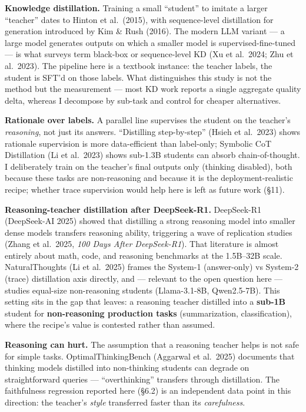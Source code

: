 \documentclass[11pt]{article}
\begin{document}
\textbf{Knowledge distillation.} Training a small ``student'' to imitate
a larger ``teacher'' dates to Hinton et al.~(2015), with sequence-level
distillation for generation introduced by Kim \& Rush (2016). The modern
LLM variant --- a large model generates outputs on which a smaller model
is supervised-fine-tuned --- is what surveys term black-box or
sequence-level KD (Xu et al.~2024; Zhu et al.~2023). The pipeline here
is a textbook instance: the teacher labels, the student is SFT'd on
those labels. What distinguishes this study is not the method but the
measurement --- most KD work reports a single aggregate quality delta,
whereas I decompose by sub-task and control for cheaper alternatives.

\textbf{Rationale over labels.} A parallel line supervises the student
on the teacher's \emph{reasoning}, not just its answers. ``Distilling
step-by-step'' (Hsieh et al.~2023) shows rationale supervision is more
data-efficient than label-only; Symbolic CoT Distillation (Li et
al.~2023) shows sub-1.3B students can absorb chain-of-thought. I
deliberately train on the teacher's final outputs only (thinking
disabled), both because these tasks are non-reasoning and because it is
the deployment-realistic recipe; whether trace supervision would help
here is left as future work (§11).

\textbf{Reasoning-teacher distillation after DeepSeek-R1.} DeepSeek-R1
(DeepSeek-AI 2025) showed that distilling a strong reasoning model into
smaller dense models transfers reasoning ability, triggering a wave of
replication studies (Zhang et al.~2025, \emph{100 Days After
DeepSeek-R1}). That literature is almost entirely about math, code, and
reasoning benchmarks at the 1.5B--32B scale. NaturalThoughts (Li et
al.~2025) frames the System-1 (answer-only) vs System-2 (trace)
distillation axis directly, and --- relevant to the open question here
--- studies equal-size non-reasoning students (Llama-3.1-8B,
Qwen2.5-7B). This setting sits in the gap that leaves: a reasoning
teacher distilled into a \textbf{sub-1B} student for
\textbf{non-reasoning production tasks} (summarization, classification),
where the recipe's value is contested rather than assumed.

\textbf{Reasoning can hurt.} The assumption that a reasoning teacher
helps is not safe for simple tasks. OptimalThinkingBench (Aggarwal et
al.~2025) documents that thinking models distilled into non-thinking
students can degrade on straightforward queries --- ``overthinking''
transfers through distillation. The faithfulness regression reported
here (§6.2) is an independent data point in this direction: the
teacher's \emph{style} transferred faster than its \emph{carefulness}.
\end{document}
